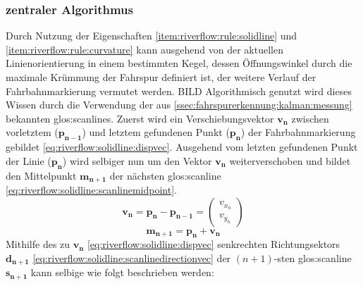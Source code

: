 \subsubsection{zentraler Algorithmus}
Durch Nutzung der Eigenschaften \ref{item:riverflow:rule:solidline} und  \ref{item:riverflow:rule:curvature} kann ausgehend von der aktuellen Linienorientierung in einem bestimmten Kegel, dessen Öffnungswinkel durch die maximale Krümmung der Fahrspur definiert ist, der weitere Verlauf der Fahrbahnmarkierung vermutet werden. BILD
Algorithmisch genutzt wird dieses Wissen durch die Verwendung der aus \ref{ssec:fahrspurerkennung:kalman:messung} bekannten \glspl{glos:scanline}.
Zuerst wird ein Verschiebungsvektor \begin{math} \boldsymbol{v_n} \end{math} zwischen vorletztem (\begin{math} \boldsymbol{p_{n-1}} \end{math}) und letztem gefundenen Punkt  (\begin{math} \boldsymbol{p_n} \end{math})  der Fahrbahnmarkierung gebildet \eqref{eq:riverflow:solidline:dispvec}. Ausgehend vom letzten gefundenen Punkt der Linie (\begin{math} \boldsymbol{p_n} \end{math}) wird selbiger nun um den Vektor \begin{math} \boldsymbol{v_n} \end{math} weiterverschoben und bildet den Mittelpunkt  \begin{math} \boldsymbol{m_{n+1}}  \end{math} der nächsten \gls{glos:scanline} \eqref{eq:riverflow:solidline:scanlinemidpoint}.
\begin{equation}
\label{eq:riverflow:solidline:dispvec}
\boldsymbol{v_n} =  \boldsymbol{p_n} - \boldsymbol{p_{n-1}}
= 
\begin{pmatrix}
v_{x_n} \\
v_{y_n}
\end{pmatrix}
\end{equation}
\begin{equation}
\label{eq:riverflow:solidline:scanlinemidpoint}
\boldsymbol{m_{n+1}} =  \boldsymbol{p_n} + \boldsymbol{v_n}
\end{equation}
Mithilfe des zu \begin{math} \boldsymbol{v_n} \end{math} \eqref{eq:riverflow:solidline:dispvec} senkrechten Richtungsektors \begin{math} \boldsymbol{d_{n+1}} \end{math} \eqref{eq:riverflow:solidline:scanlinedirectionvec} der \begin{math} (n+1)\end{math}-sten  \gls{glos:scanline} \begin{math} \boldsymbol{s_{n+1}} \end{math} kann selbige wie folgt beschrieben werden:

